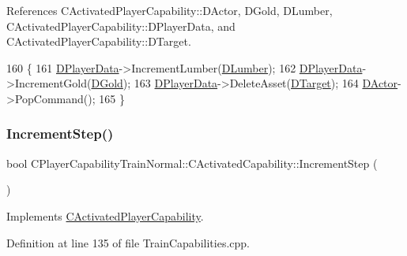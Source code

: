 References C\+Activated\+Player\+Capability\+::\+D\+Actor, D\+Gold, D\+Lumber, C\+Activated\+Player\+Capability\+::\+D\+Player\+Data, and C\+Activated\+Player\+Capability\+::\+D\+Target.


\begin{DoxyCode}
160                                                              \{
161     \hyperlink{classCActivatedPlayerCapability_a9bf27c322a73f4b11c8183cc1973c3d8}{DPlayerData}->IncrementLumber(\hyperlink{classCPlayerCapabilityTrainNormal_1_1CActivatedCapability_a49a77c92b6146819efb1a7a8b6fb8972}{DLumber});
162     \hyperlink{classCActivatedPlayerCapability_a9bf27c322a73f4b11c8183cc1973c3d8}{DPlayerData}->IncrementGold(\hyperlink{classCPlayerCapabilityTrainNormal_1_1CActivatedCapability_a1b994a572ca0fdfd64f6f71afb6b5988}{DGold});
163     \hyperlink{classCActivatedPlayerCapability_a9bf27c322a73f4b11c8183cc1973c3d8}{DPlayerData}->DeleteAsset(\hyperlink{classCActivatedPlayerCapability_a8a1cf50b6501bcfd55af0c935828e395}{DTarget});
164     \hyperlink{classCActivatedPlayerCapability_a54ca944b47bff2718330639941d402b0}{DActor}->PopCommand();
165 \}
\end{DoxyCode}
\hypertarget{classCPlayerCapabilityTrainNormal_1_1CActivatedCapability_a201f09e738af96fba1a871e4ed00f18a}{}\label{classCPlayerCapabilityTrainNormal_1_1CActivatedCapability_a201f09e738af96fba1a871e4ed00f18a} 
\subsubsection{\texorpdfstring{Increment\+Step()}{IncrementStep()}}
{\footnotesize\ttfamily bool C\+Player\+Capability\+Train\+Normal\+::\+C\+Activated\+Capability\+::\+Increment\+Step (\begin{DoxyParamCaption}{ }\end{DoxyParamCaption})\hspace{0.3cm}{\ttfamily [virtual]}}



Implements \hyperlink{classCActivatedPlayerCapability_a943b5999a57504399293250382c0ec6a}{C\+Activated\+Player\+Capability}.



Definition at line 135 of file Train\+Capabilities.\+cpp.



